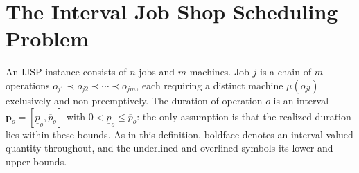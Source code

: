 \documentclass[review,authoryear,11pt]{elsarticle}
\begin{document}
\section{The Interval Job Shop Scheduling Problem}
\label{sec:problem}

An IJSP instance consists of $n$ jobs and $m$ machines. Job $j$ is a
chain of $m$ operations $o_{j1} \prec o_{j2} \prec \cdots \prec o_{jm}$,
each requiring a distinct machine $\mu(o_{jl})$ exclusively and
non-preemptively. The duration of operation $o$ is an interval
$\mathbf{p}_o = [\underline{p}_o, \overline{p}_o]$ with
$0 < \underline{p}_o \le \overline{p}_o$: the only assumption is that the
realized duration lies within these bounds. As in this definition,
boldface denotes an interval-valued quantity throughout, and the
underlined and overlined symbols its lower and upper bounds.
\end{document}
